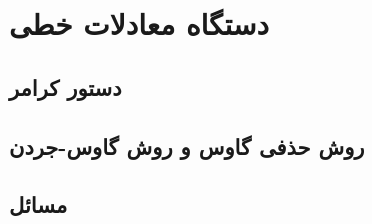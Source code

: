 \chapter{دستگاه معادلات خطی}
\thispagestyle{empty}

\section{دستور کرامر}

\section{روش حذفی گاوس و روش گاوس-جردن}

\section{مسائل}
